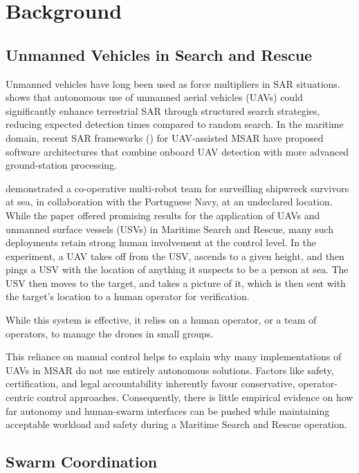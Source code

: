 \section{Background}\label{sec:background}

\subsection{Unmanned Vehicles in Search and Rescue}\label{subsec:unmanned-vehicles-in-search-and-rescue}

Unmanned vehicles have long been used as force multipliers in SAR situations.
\cite{waharte2010supporting} shows that autonomous use of unmanned aerial vehicles (UAVs) could significantly enhance terrestrial SAR through structured search strategies, reducing expected detection times compared to random search.
In the maritime domain, recent SAR frameworks (\cite{messmer2024uavassistedmaritimesearchrescue}) for UAV-assisted MSAR have proposed software architectures that combine onboard UAV detection with more advanced ground-station processing.

\cite{7761074} demonstrated a co-operative multi-robot team for surveilling shipwreck survivors at sea, in collaboration with the Portuguese Navy, at an undeclared location.
While the paper offered promising results for the application of UAVs and unmanned surface vessels (USVs) in Maritime Search and Rescue, many such deployments retain strong human involvement at the control level.
In the experiment, a UAV takes off from the USV, ascends to a given height, and then pings a USV with the location of anything it suspects to be a person at sea.
The USV then moves to the target, and takes a picture of it, which is then sent with the target's location to a human operator for verification.

While this system is effective, it relies on a human operator, or a team of operators, to manage the drones in small groups.

This reliance on manual control helps to explain why many implementations of UAVs in MSAR do not use entirely autonomous solutions.
Factors like safety, certification, and legal accountability inherently favour conservative, operator-centric control approaches.
Consequently, there is little empirical evidence on how far autonomy and human-swarm interfaces can be pushed while maintaining acceptable workload and safety during a Maritime Search and Rescue operation.

\subsection{Swarm Coordination}\label{subsec:swarm-coordination}

